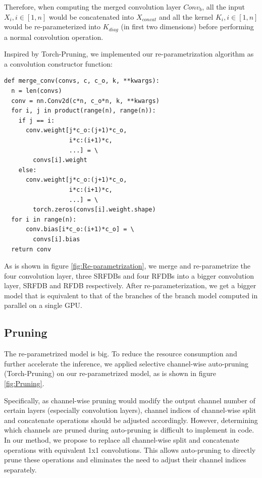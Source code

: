 \documentclass[10pt,twocolumn,letterpaper]{article}
\begin{document}
Therefore, when computing the merged convolution layer $Conv_b$, all the input $X_i, i\in[1,n]$ would be concatenated into $X_{concat}$ and all the kernel $K_i, i\in[1,n]$ would be re-parameterized into $K_{diag}$ (in first two dimensions) before performing a normal convolution operation.

Inspired by Torch-Pruning\cite{fang2023depgraph}, we implemented our re-parametrization algorithm as a convolution constructor function:
\begin{verbatim}
def merge_conv(convs, c, c_o, k, **kwargs):
  n = len(convs)
  conv = nn.Conv2d(c*n, c_o*n, k, **kwargs)
  for i, j in product(range(n), range(n)):
    if j == i:
      conv.weight[j*c_o:(j+1)*c_o,
                  i*c:(i+1)*c,
                  ...] = \
        convs[i].weight
    else:
      conv.weight[j*c_o:(j+1)*c_o,
                  i*c:(i+1)*c,
                  ...] = \
        torch.zeros(convs[i].weight.shape)
  for i in range(n):
      conv.bias[i*c_o:(i+1)*c_o] = \
        convs[i].bias
  return conv
\end{verbatim}

As is shown in figure \ref{fig:Re-parametrization}, we merge and re-parametrize the four convolution layer, three SRFDBs and four RFDBs into a bigger convolution layer, SRFDB and RFDB respectively. 
After re-parameterization, we get a bigger model that is equivalent to that of the branches of the branch model computed in parallel on a single GPU.

\subsection{Pruning}
The re-parametrized model is big. To reduce the resource consumption and further accelerate the inference, we applied selective channel-wise auto-pruning (Torch-Pruning\cite{fang2023depgraph}) on our re-parametrized model, as is shown in figure \ref{fig:Pruning}. 

Specifically, as channel-wise pruning would modify the output channel number of certain layers (especially convolution layers), channel indices of channel-wise split and concatenate operations should be adjusted accordingly.
However, determining which channels are pruned during auto-pruning is difficult to implement in code.
In our method, we propose to replace all channel-wise split and concatenate operations with equivalent 1x1 convolutions.
This allows auto-pruning to directly prune these operations and eliminates the need to adjust their channel indices separately.
\end{document}
